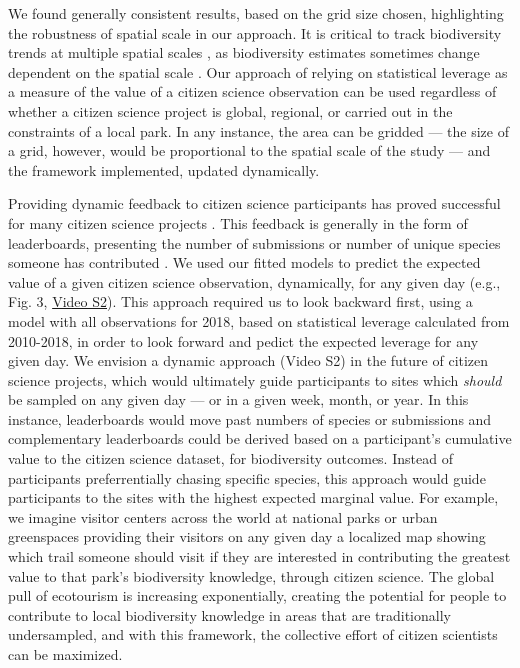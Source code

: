 \documentclass[9pt,twocolumn,twoside,lineno]{pnas-new}
\begin{document}
We found generally consistent results, based on the grid size chosen, highlighting the robustness of spatial scale in our approach. It is critical to track biodiversity trends at multiple spatial scales \cite{soberon2007assessing}, as biodiversity estimates sometimes change dependent on the spatial scale \cite{chase2013scale}. Our approach of relying on statistical leverage as a measure of the value of a citizen science observation can be used regardless of whether a citizen science project is global, regional, or carried out in the constraints of a local park. In any instance, the area can be gridded --- the size of a grid, however, would be proportional to the spatial scale of the study --- and the framework implemented, updated dynamically.

Providing dynamic feedback to citizen science participants has proved successful for many citizen science projects \cite{rowley2019frogid, wiggins2011conservation, xue2016avicaching}. This feedback is generally in the form of leaderboards, presenting the number of submissions or number of unique species someone has contributed \cite{wood2011ebird}. We used our fitted models to predict the expected value of a given citizen science observation, dynamically, for any given day (e.g., Fig. 3, \href{https://github.com/coreytcallaghan/optimize_citizen_science_obs/blob/master/Figures/dynamic_map.gif}{Video S2}). This approach required us to look backward first, using a model with all observations for 2018, based on statistical leverage calculated from 2010-2018, in order to look forward and pedict the expected leverage for any given day. We envision a dynamic approach (Video S2) in the future of citizen science projects, which would ultimately guide participants to sites which \textit{should} be sampled on any given day --- or in a given week, month, or year. In this instance, leaderboards would move past numbers of species or submissions and complementary leaderboards could be derived based on a participant's cumulative value to the citizen science dataset, for biodiversity outcomes. Instead of participants preferrentially chasing specific species, this approach would guide participants to the sites with the highest expected marginal value. For example, we imagine visitor centers across the world at national parks or urban greenspaces providing their visitors on any given day a localized map showing which trail someone should visit if they are interested in contributing the greatest value to that park's biodiversity knowledge, through citizen science. The global pull of ecotourism \cite{sharpley2006ecotourism} is increasing exponentially, creating the potential for people to contribute to local biodiversity knowledge in areas that are traditionally undersampled, and with this framework, the collective effort of citizen scientists can be maximized.
\end{document}
